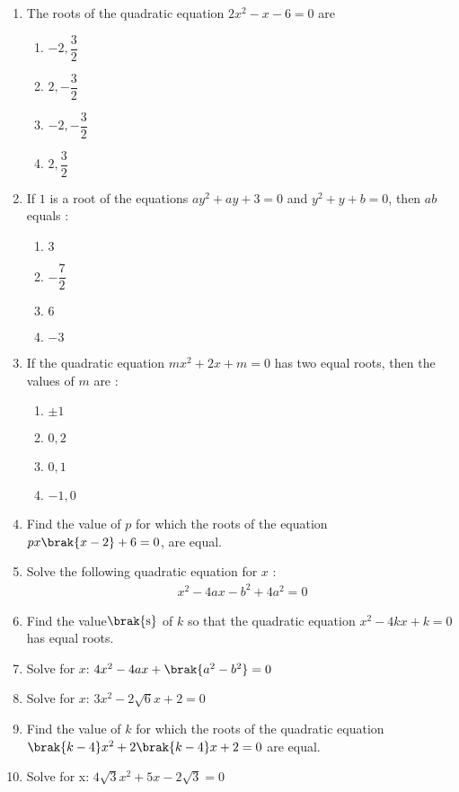 \begin{enumerate}
\item The roots of the quadratic equation  $2x^2 - x - 6 = 0$ are 
\begin{enumerate}
\item $-2,\dfrac{3}{2}$ 
\item $2,-\dfrac{3}{2}$ 
\item $-2,-\dfrac{3}{2}$ 
\item $2,\dfrac{3}{2}$ 
\end{enumerate}
\item If $1$ is a root of the equations $ay^2 + ay + 3 = 0$ and $y^2 + y + b = 0$, then $ab$ equals : 
\begin{enumerate}
\item $3$ 
\item $-\dfrac{7}{2}$ 
\item $6$ 
\item $-3$ 
\end{enumerate}
\item If the quadratic equation $mx^2 + 2x + m = 0$ has two equal roots, then the values of $m$ are : 
\begin{enumerate}
\item $\pm 1$ 
\item $0,2$ 
\item $0,1$ 
\item $-1,0$ 
\end{enumerate}
\item Find the value of $p$ for which the roots of the equation $px\brak{x-2} + 6 = 0$, are equal. 
\item Solve the following quadratic equation for $x$ : 
\begin{align}
x^2 - 4 a x - b^2 + 4a^2 = 0 
\end{align}
\item Find the value$\brak{\text{s}}$ of $k$ so that the quadratic equation $x^2 - 4kx + k = 0$ has equal roots. 
\item Solve for $x$: $4x^2 - 4ax + \brak{a^2 - b^2} = 0$ 
\item Solve for $x$: $3x^2 - 2\sqrt 6 x + 2 = 0$ 

\item Find the value of $k$ for which the roots of the quadratic equation $\brak{k - 4} x^2 + 2\brak{k-4} x + 2 =0$ are equal. 
\item Solve for x: 
$4\sqrt 3 x^2 + 5x - 2\sqrt 3 = 0$ 
\end{enumerate}
